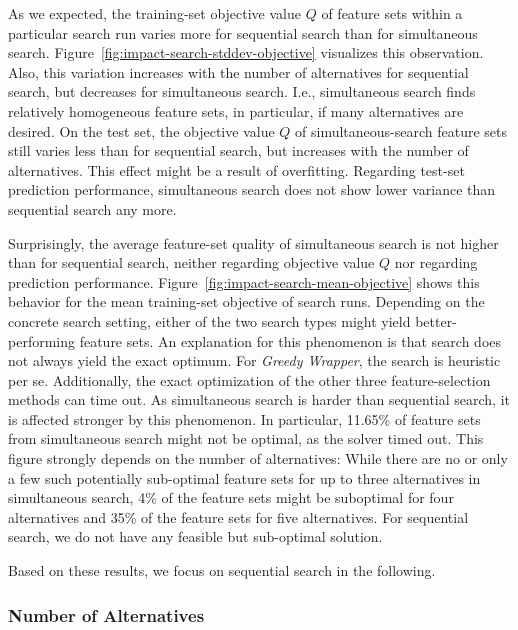 \documentclass{article}
\theoremstyle{definition}
\begin{document}
As we expected, the training-set objective value $Q$ of feature sets within a particular search run varies more for sequential search than for simultaneous search.
Figure~\ref{fig:impact-search-stddev-objective} visualizes this observation.
Also, this variation increases with the number of alternatives for sequential search, but decreases for simultaneous search.
I.e., simultaneous search finds relatively homogeneous feature sets, in particular, if many alternatives are desired.
On the test set, the objective value $Q$ of simultaneous-search feature sets still varies less than for sequential search, but increases with the number of alternatives.
This effect might be a result of overfitting.
Regarding test-set prediction performance, simultaneous search does not show lower variance than sequential search any more.

Surprisingly, the average feature-set quality of simultaneous search is not higher than for sequential search, neither regarding objective value $Q$ nor regarding prediction performance.
Figure~\ref{fig:impact-search-mean-objective} shows this behavior for the mean training-set objective of search runs.
Depending on the concrete search setting, either of the two search types might yield better-performing feature sets.
An explanation for this phenomenon is that search does not always yield the exact optimum.
For \emph{Greedy Wrapper}, the search is heuristic per se.
Additionally, the exact optimization of the other three feature-selection methods can time out.
As simultaneous search is harder than sequential search, it is affected stronger by this phenomenon.
In particular, 11.65\% of feature sets from simultaneous search might not be optimal, as the solver timed out.
This figure strongly depends on the number of alternatives:
While there are no or only a few such potentially sub-optimal feature sets for up to three alternatives in simultaneous search, 4\% of the feature sets might be suboptimal for four alternatives and 35\% of the feature sets for five alternatives.
For sequential search, we do not have any feasible but sub-optimal solution.

Based on these results, we focus on sequential search in the following.

\subsubsection{Number of Alternatives}
\end{document}
